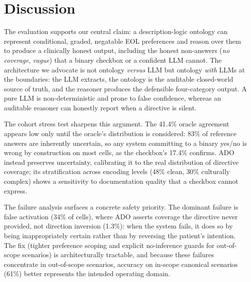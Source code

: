 \documentclass[10pt]{article}
\begin{document}
\section{Discussion}
The evaluation supports our central claim: a description-logic ontology can represent conditional, graded, negatable EOL preferences and reason over them to produce a clinically honest output, including the honest non-answers (\emph{no coverage}, \emph{vague}) that a binary checkbox or a confident LLM cannot. The architecture we advocate is not ontology \emph{versus} LLM but ontology \emph{with} LLMs at the boundaries: the LLM extracts, the ontology is the auditable closed-world source of truth, and the reasoner produces the defensible four-category output. A pure LLM is non-deterministic and prone to false confidence, whereas an auditable reasoner can honestly report when a directive is silent.

The cohort stress test sharpens this argument. The 41.4\% oracle agreement appears low only until the oracle's distribution is considered: 83\% of reference answers are inherently uncertain, so any system committing to a binary yes/no is wrong by construction on most cells, as the checkbox's 17.4\% confirms. ADO instead preserves uncertainty, calibrating it to the real distribution of directive coverage; its stratification across encoding levels (48\% clean, 30\% culturally complex) shows a sensitivity to documentation quality that a checkbox cannot express.

The failure analysis surfaces a concrete safety priority. The dominant failure is false activation (34\% of cells), where ADO asserts coverage the directive never provided, not direction inversion (1.3\%): when the system fails, it does so by being inappropriately certain rather than by reversing the patient's intention. The fix (tighter preference scoping and explicit no-inference guards for out-of-scope scenarios) is architecturally tractable, and because these failures concentrate in out-of-scope scenarios, accuracy on in-scope canonical scenarios (61\%) better represents the intended operating domain.
\end{document}
